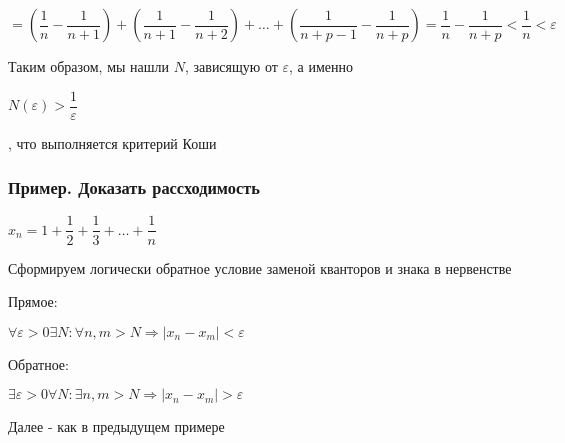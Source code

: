 $
=
\left( \dfrac{1}{n} - \dfrac{1}{n+1} \right) +
\left( \dfrac{1}{n+1} - \dfrac{1}{n+2} \right) +
\ldots +
\left( \dfrac{1}{n+p-1} - \dfrac{1}{n+p} \right)
=
\dfrac{1}{n} - \dfrac{1}{n+p} < \dfrac{1}{n} < \varepsilon
$

Таким образом, мы нашли $ N $, зависящую от $ \varepsilon $, а именно

$ N(\varepsilon) > \dfrac{1}{\varepsilon} $

, что выполняется критерий Коши

\subsubsection{Пример. Доказать рассходимость}

$ x_{n} = 1 +
\dfrac{1}{2} + 
\dfrac{1}{3} + 
\ldots +
\dfrac{1}{n}
$

Сформируем логически обратное условие заменой кванторов и знака в нервенстве

Прямое:

$ \forall \varepsilon > 0 \exists N: \forall n,m > N \Rightarrow |x_{n} - x_{m}| < \varepsilon $

Обратное:

$ \exists \varepsilon > 0 \forall N: \exists n,m > N \Rightarrow |x_{n} - x_{m}| > \varepsilon $

Далее - как в предыдущем примере